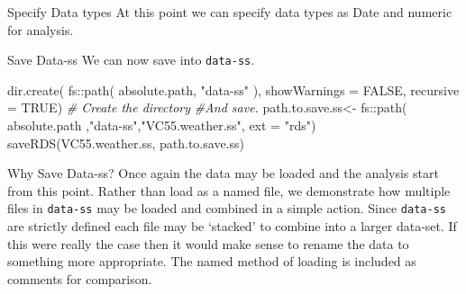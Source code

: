 \documentclass[
  ignorenonframetext,
]{beamer}
\newenvironment{Shaded}{\begin{snugshade}}{\end{snugshade}}
\newcommand{\AttributeTok}[1]{\textcolor[rgb]{0.77,0.63,0.00}{#1}}
\newcommand{\CommentTok}[1]{\textcolor[rgb]{0.56,0.35,0.01}{\textit{#1}}}
\newcommand{\ConstantTok}[1]{\textcolor[rgb]{0.00,0.00,0.00}{#1}}
\newcommand{\FunctionTok}[1]{\textcolor[rgb]{0.00,0.00,0.00}{#1}}
\newcommand{\NormalTok}[1]{#1}
\newcommand{\OtherTok}[1]{\textcolor[rgb]{0.56,0.35,0.01}{#1}}
\newcommand{\SpecialCharTok}[1]{\textcolor[rgb]{0.00,0.00,0.00}{#1}}
\newcommand{\StringTok}[1]{\textcolor[rgb]{0.31,0.60,0.02}{#1}}
\begin{document}
\begin{frame}[fragile]{Specify Data types}
\protect\hypertarget{specify-data-types}{}
At this point we can specify data types as Date and numeric for
analysis.

\begin{Shaded}
\end{Shaded}
\end{frame}

\begin{frame}[fragile]{Save Data-ss}
\protect\hypertarget{save-data-ss}{}
We can now save into \texttt{data-ss}.

\begin{Shaded}
\begin{Highlighting}[]
\FunctionTok{dir.create}\NormalTok{( }
\NormalTok{          fs}\SpecialCharTok{::}\FunctionTok{path}\NormalTok{( absolute.path,}
            \StringTok{"data{-}ss"}\NormalTok{ ),  }
            \AttributeTok{showWarnings =} \ConstantTok{FALSE}\NormalTok{,}
            \AttributeTok{recursive =} \ConstantTok{TRUE}\NormalTok{) }\CommentTok{\# Create the directory}
\CommentTok{\#And save.}
\NormalTok{path.to.save.ss}\OtherTok{\textless{}{-}}\NormalTok{ fs}\SpecialCharTok{::}\FunctionTok{path}\NormalTok{( absolute.path}
\NormalTok{                               ,}\StringTok{"data{-}ss"}\NormalTok{,}\StringTok{"VC55.weather.ss"}\NormalTok{,}
                            \AttributeTok{ext =} \StringTok{"rds"}\NormalTok{)}
\FunctionTok{saveRDS}\NormalTok{(VC55.weather.ss, path.to.save.ss)}
\end{Highlighting}
\end{Shaded}
\end{frame}

\begin{frame}[fragile]{Why Save Data-ss?}
\protect\hypertarget{why-save-data-ss}{}
Once again the data may be loaded and the analysis start from this
point. Rather than load as a named file, we demonstrate how multiple
files in \texttt{data-ss} may be loaded and combined in a simple action.
Since \texttt{data-ss} are strictly defined each file may be `stacked'
to combine into a larger data-set. If this were really the case then it
would make sense to rename the data to something more appropriate. The
named method of loading is included as comments for comparison.
\end{frame}
\end{document}
